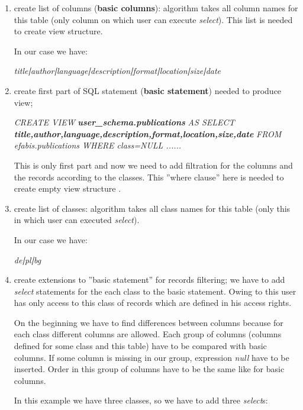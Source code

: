 \begin{enumerate}
\item create list of columns (\textbf{basic columns}): algorithm takes all
column names for this table (only column on which user can execute
\emph{select}). This list is needed to create view structure. 


In our case we have:

\emph{title}\textbf{\emph{|}}\emph{author}\textbf{\emph{|}}\emph{language}\textbf{\emph{|}}\emph{description}\textbf{\emph{|}}\emph{format}\textbf{\emph{|}}\emph{location}\textbf{\emph{|}}\emph{size}\textbf{\emph{|}}\emph{date}

\item create first part of SQL statement (\textbf{basic statement}) needed
to produce view;


\begin{center}\emph{CREATE VIEW} \textbf{\emph{user\_schema.publications}}
\emph{AS SELECT} \textbf{\emph{title,author,language,description,format,location,size,date}}
\emph{FROM efabis.publications WHERE class=NULL ......}\end{center}

This is only first part and now we need to add filtration for the columns
and the records according to the classes. This ''where clause'' here is
needed to create empty view structure .

\item create list of classes: algorithm takes all class names for this table
(only this in which user can executed \emph{select}).


In our case we have:

\emph{de}\textbf{\emph{|}}\emph{pl}\textbf{\emph{|}}\emph{bg}

\item create extensions to ''basic statement'' for records filtering;
we have to add \emph{select} statements for the each class to the basic
statement. Owing to this user has only access to this class of records
which are defined in his access rights. 


On the beginning we have to find differences between columns because
for each class different columns are allowed. Each group of columns
(columns defined for some class and this table) have to be compared
with basic columns. If some column is missing in our group, expression
\emph{null} have to be inserted. Order in this group of columns
have to be the same like for basic columns.

In this example we have three classes, so we have to add three \emph{select}s:


\end{enumerate}
